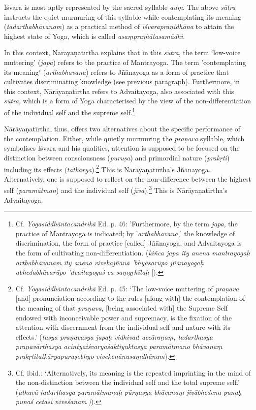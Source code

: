 Īśvara is most aptly represented by the sacred syllable \textit{auṃ}. The above \textit{sūtra} instructs the quiet murmuring of this syllable while contemplating its meaning (\textit{tadarthabhāvanam}) as a practical method of \textit{īśvarapraṇidhāna} to attain the highest state of Yoga, which is called \textit{asaṃprajñātasamādhi}.

In this context, Nārāyaṇatīrtha explains that in this \textit{sūtra}, the term `low-voice muttering' (\textit{japa}) refers to the practice of Mantrayoga. The term 'contemplating its meaning' (\textit{arthabhavana}) refers to Jñānayoga as a form of practice that cultivates discriminating knowledge (see previous paragraph). Furthermore, in this context, Nārāyaṇatīrtha refers to Advaitayoga, also associated with this \textit{sūtra}, which is a form of Yoga characterised by the view of the non-differentiation of the individual self and the supreme self.\footnote{Cf. \textit{Yogasiddhāntacandrikā} Ed. p. 46: 'Furthermore, by the term \textit{japa}, the practice of Mantrayoga is indicated; by '\textit{arthabhavana},' the knowledge of discrimination, the form of practice [called] Jñānayoga, and Advaitayoga is the form of cultivating non-differentiation. (\textit{kiñca japa ity anena mantrayogaḥ arthabhāvanam ity anena vivekajñānā 'bhyāsarūpo jñānayogaḥ abhedabhāvarūpo 'dvaitayogaś ca saṃgṛhītaḥ} |).}

Nārāyaṇatīrtha, thus, offers two alternatives about the specific performance of the contemplation. Either, while quietly murmuring the \textit{praṇava} syllable, which symbolises Īśvara and his qualities, attention is supposed to be focused on the distinction between consciousness (\textit{puruṣa}) and primordial nature (\textit{prakṛti}) including its effects (\textit{tatkārya}).\footnote{Cf. \textit{Yogasiddhāntacandrikā} Ed. p. 45: `The low-voice muttering of \textit{praṇava} [and] pronunciation according to the rules [along with] the contemplation of the meaning of that \textit{praṇava}, [being associated with] the Supreme Self endowed with inconceivable power and supremacy, is the fixation of the attention with discernment from the individual self and nature with its effects.' (\textit{tasya praṇavasya japaḥ vidhivad uccāraṇaṃ, tadarthasya praṇavārthasya acintyaiśvaryaśaktiyuktasya paramātmano bhāvanaṃ prakṛtitatkāryapuruṣebhyo vivekenānusaṃdhānam}).} This is Nārāyaṇatīrtha's Jñānayoga. Alternatively, one is supposed to reflect on the non-difference between the highest self (\textit{paramātman}) and the individual self (\textit{jīva}).\footnote{Cf. ibid.: `Alternatively, its meaning is the repeated imprinting in the mind of the non-distinction between the individual self and the total supreme self.' (\textit{athavā tadarthasya paramātmanaḥ pūrṇasya bhāvanaṃ jīvābhedena punaḥ punaś cetasi niveśanam |}).} This is Nārāyaṇatīrtha's Advaitayoga.

